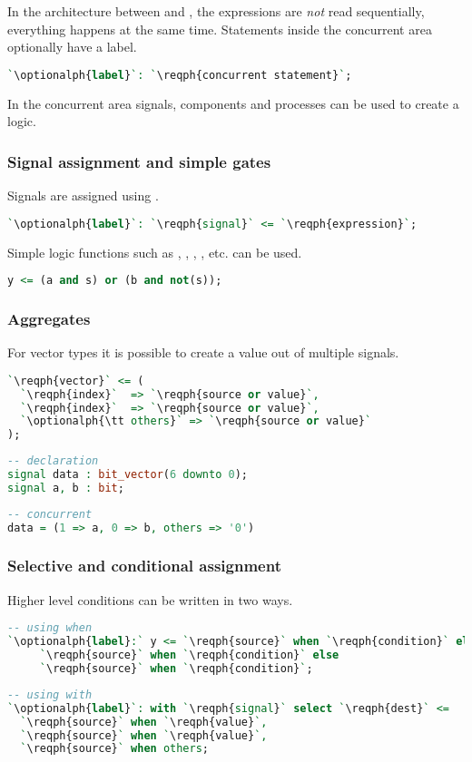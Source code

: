 In the architecture between  and , the expressions
are \emph{not} read sequentially, everything happens at the same time.
Statements inside the concurrent area optionally have a label.
\begin{lstlisting}[language=vhdl]
`\optionalph{label}`: `\reqph{concurrent statement}`;
\end{lstlisting}
In the concurrent area signals, components and processes can be used to create
a logic.

\subsubsection{Signal assignment and simple gates}
Signals are assigned using \vhdl{<=}.
\begin{lstlisting}[language=vhdl]
`\optionalph{label}`: `\reqph{signal}` <= `\reqph{expression}`;
\end{lstlisting}
Simple logic functions such as , , , ,
etc. can be used.
\begin{lstlisting}[language=vhdl]
 y <= (a and s) or (b and not(s));
\end{lstlisting}

\subsubsection{Aggregates}
For vector types it is possible to create a value out of multiple signals.
\begin{lstlisting}[language=vhdl]
`\reqph{vector}` <= (
  `\reqph{index}`  => `\reqph{source or value}`,
  `\reqph{index}`  => `\reqph{source or value}`,
  `\optionalph{\tt others}` => `\reqph{source or value}`
);
\end{lstlisting}
\begin{lstlisting}[language=vhdl]
-- declaration
signal data : bit_vector(6 downto 0);
signal a, b : bit;
\end{lstlisting}
\begin{lstlisting}[language=vhdl]
-- concurrent
data = (1 => a, 0 => b, others => '0')
\end{lstlisting}

\subsubsection{Selective and conditional assignment}
Higher level conditions can be written in two ways. 
\begin{lstlisting}[language=vhdl]
-- using when
`\optionalph{label}:` y <= `\reqph{source}` when `\reqph{condition}` else
     `\reqph{source}` when `\reqph{condition}` else
     `\reqph{source}` when `\reqph{condition}`;
\end{lstlisting}
\begin{lstlisting}[language=vhdl]
-- using with
`\optionalph{label}`: with `\reqph{signal}` select `\reqph{dest}` <= 
  `\reqph{source}` when `\reqph{value}`,
  `\reqph{source}` when `\reqph{value}`,
  `\reqph{source}` when others;
\end{lstlisting}

